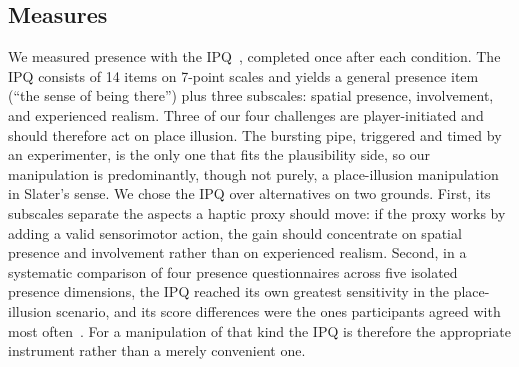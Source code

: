 
\subsection{Measures}
\label{sec:study-measures}

We measured presence with the IPQ~\cite{Schubert.2001, Schubert.2003, igroup}, completed once after each condition. The IPQ consists of 14 items on 7-point scales and yields a general presence item (``the sense of being there'') plus three subscales: spatial presence, involvement, and experienced realism. Three of our four challenges are player-initiated and should therefore act on place illusion. The bursting pipe, triggered and timed by an experimenter, is the only one that fits the plausibility side, so our manipulation is predominantly, though not purely, a place-illusion manipulation in Slater's sense. We chose the IPQ over alternatives on two grounds. 
First, its subscales separate the aspects a haptic proxy should move: if the proxy works by adding a valid sensorimotor action, the gain should concentrate on spatial presence and involvement rather than on experienced realism. Second, in a systematic comparison of four presence questionnaires across five isolated presence dimensions, the IPQ reached its own greatest sensitivity in the place-illusion scenario, and its score differences were the ones participants agreed with most often~\cite{presence-questionnaires}. For a manipulation of that kind the IPQ is therefore the appropriate instrument rather than a merely convenient one.
